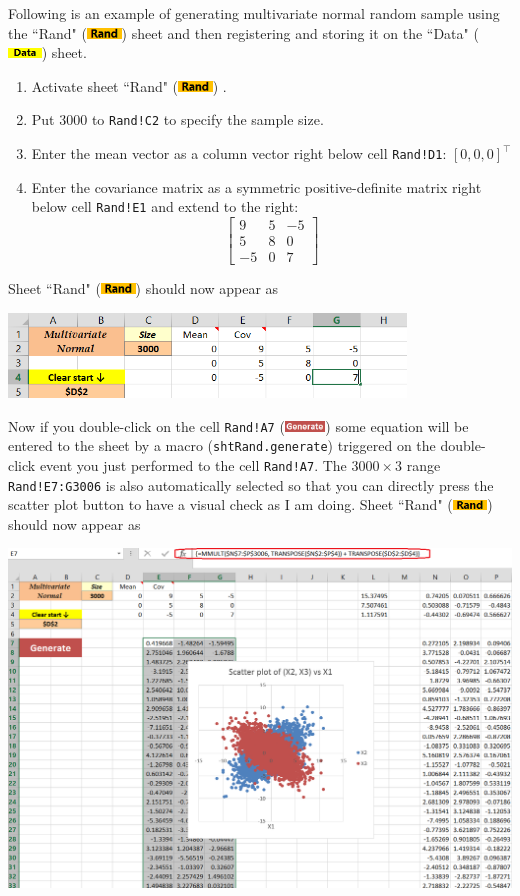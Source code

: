 \documentclass[article]{jss}
\numberwithin{equation}{subsection}
\newcommand{\shtData}{``Data" (\includegraphics[height=8pt, keepaspectratio=true]{img/DataSheetTab_png}) }
\newcommand{\shtRand}{``Rand" (\includegraphics[height=8pt, keepaspectratio=true]{img/RandSheetTab_png}) }
\begin{document}
        Following is an example of generating multivariate normal random sample using the \shtRand sheet and then registering and storing it on the \shtData sheet. \\
        \begin{enumerate}
        \item Activate sheet \shtRand.
        \item Put 3000 to \texttt{Rand!C2} to specify the sample size.
        \item Enter the mean vector as a column vector right below cell \texttt{Rand!D1}: $[0,0,0]^\intercal$
        \item Enter the covariance matrix as a symmetric positive-definite matrix right below cell \texttt{Rand!E1} and extend to the right:  
        \[\left[ {\begin{array}{*{20}{c}}
        9&5&-5 \\ 
        5&8&0 \\ 
        -5&0&7 
        \end{array}} \right]\]
        \end{enumerate}
        Sheet \shtRand should now appear as
        \begin{center}
	        \includegraphics[height=64pt, keepaspectratio=true]{img/RandSheetAfterInput_png}
        \end{center}
        Now if you double-click on the cell \texttt{Rand!A7} (\includegraphics[height=8pt, keepaspectratio=true]{img/RandSheet_GenerateButton_png}) some equation will be entered to the sheet by a  macro (\texttt{shtRand.generate}) triggered on the double-click event you just performed to the cell \texttt{Rand!A7}. The $3000\times 3$ range \texttt{Rand!E7:G3006} is also automatically selected so that you can directly press the scatter plot button to have a visual check as I am doing. Sheet \shtRand should now appear as
        \begin{center}
	        \includegraphics[width=\linewidth, keepaspectratio=true]{img/RandSheetOutput_png}
        \end{center}
\end{document}
